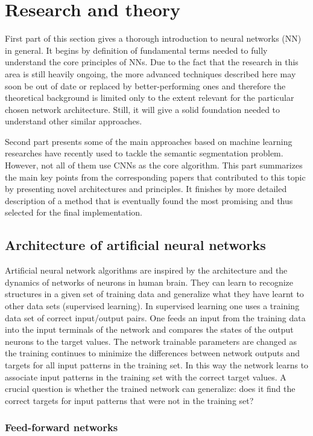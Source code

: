 \chapter{Research and theory}
\label{research}
First part of this section gives a thorough introduction to neural networks (NN) in general. It begins by definition of fundamental terms needed to fully understand the core principles of NNs. Due to the fact that the research in this area is still heavily ongoing, the more advanced techniques described here may soon be out of date or replaced by better-performing ones and therefore the theoretical background is limited only to the extent relevant for the particular chosen network architecture. Still, it will give a solid foundation needed to understand other similar approaches. 

Second part presents some of the main approaches based on machine learning researches have recently used to tackle the semantic segmentation problem. However, not all of them use CNNs as the core algorithm. This part summarizes the main key points from the corresponding papers that contributed to this topic by presenting novel architectures and principles. It finishes by more detailed description of a method that is eventually found the most promising and thus selected for the final implementation.

\section{Architecture of artificial neural networks}
Artificial neural network algorithms are inspired by the architecture and the dynamics
of networks of neurons in human brain. They can learn to recognize structures in a given set of training data and generalize what they have learnt to other data sets (supervised learning). In supervised learning one uses a training data set of correct input/output pairs. One feeds an input from the training data into the input terminals of the network and compares the states of the output neurons to the target values. The network trainable parameters are changed as the training continues to minimize the differences between network outputs and targets for all input patterns in the training set. In this way the network learns to associate input patterns in the training set with the correct target values. A crucial question is whether the trained network can generalize: does it find the correct targets for input patterns that were not in the training set? 

\subsection{Feed-forward networks}

